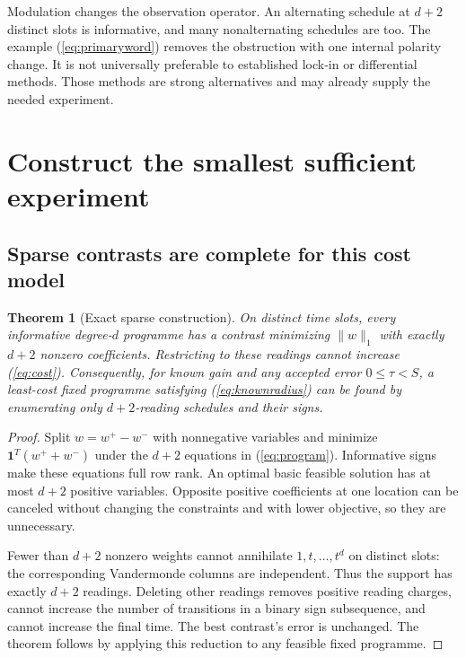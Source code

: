 \documentclass[11pt,letterpaper]{article}
\newcommand{\norm}[1]{\lVert#1\rVert}
\newtheorem{theorem}{Theorem}[section]
\theoremstyle{definition}\newtheorem{definition}[theorem]{Definition}
\theoremstyle{remark}\newtheorem{remark}[theorem]{Remark}
\begin{document}
Modulation changes the observation operator. An alternating schedule at $d+2$ distinct slots is informative, and many nonalternating schedules are too. The example (\ref{eq:primaryword}) removes the obstruction with one internal polarity change. It is not universally preferable to established lock-in or differential methods. Those methods are strong alternatives and may already supply the needed experiment.

\section{Construct the smallest sufficient experiment}
\label{sec:sparse}
\subsection{Sparse contrasts are complete for this cost model}
\begin{theorem}[Exact sparse construction]
\label{thm:sparse}
On distinct time slots, every informative degree-$d$ programme has a contrast minimizing $\norm{w}_1$ with exactly $d+2$ nonzero coefficients. Restricting to these readings cannot increase (\ref{eq:cost}). Consequently, for known gain and any accepted error $0\le\tau<S$, a least-cost fixed programme satisfying (\ref{eq:knownradius}) can be found by enumerating only $d+2$-reading schedules and their signs.
\end{theorem}
\begin{proof}
Split $w=w^+-w^-$ with nonnegative variables and minimize $\mathbf1^T(w^++w^-)$ under the $d+2$ equations in (\ref{eq:program}). Informative signs make these equations full row rank. An optimal basic feasible solution has at most $d+2$ positive variables. Opposite positive coefficients at one location can be canceled without changing the constraints and with lower objective, so they are unnecessary.

Fewer than $d+2$ nonzero weights cannot annihilate $1,t,\ldots,t^d$ on distinct slots: the corresponding Vandermonde columns are independent. Thus the support has exactly $d+2$ readings. Deleting other readings removes positive reading charges, cannot increase the number of transitions in a binary sign subsequence, and cannot increase the final time. The best contrast's error is unchanged. The theorem follows by applying this reduction to any feasible fixed programme.
\end{proof}
\end{document}
